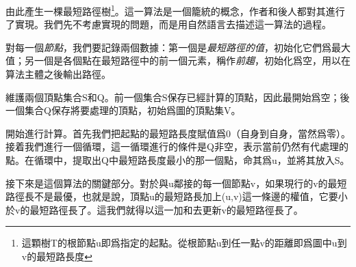 由此產生一棵最短路徑樹\footnote{這顆樹T的根節點u即爲指定的起點。從根節點u到任一點v的距離即爲圖中u到v的最短路長度}。這一算法是一個籠統的概念，作者和後人都對其進行了實現。我們先不考慮實現的問題，而是用自然語言去描述這一算法的過程。

對每一個\emph{節點}，我們要記錄兩個數據：第一個是\emph{最短路徑的值}，初始化它們爲最大值；另一個是各個點在最短路徑中的前一個元素，稱作\emph{前趨}，初始化爲空，用以在算法主體之後輸出路徑。

維護兩個頂點集合S和Q。前一個集合S保存已經計算的頂點，因此最開始爲空；後一個集合Q保存將要處理的頂點，初始爲圖的頂點集V。

開始進行計算。首先我們把起點的最短路長度賦值爲0（自身到自身，當然爲零）。接着我們進行一個循環，這一循環進行的條件是Q非空，表示當前仍然有代處理的點。在循環中，提取出Q中最短路長度最小的那一個點，命其爲u，並將其放入S。

接下來是這個算法的關鍵部分。對於與u鄰接的每一個節點v，如果現行的v的最短路徑長不是最優，也就是說，頂點u的最短路長加上(u,v)這一條邊的權值，它要小於v的最短路徑長了。這我們就得以這一加和去更新v的最短路徑長了。